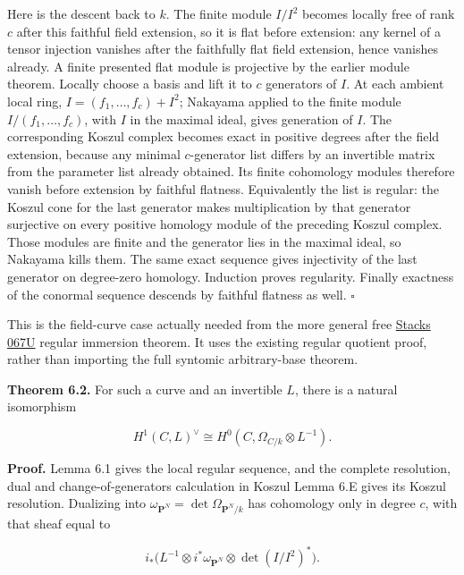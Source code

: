 \documentclass[11pt,a4paper,openany]{report}
\begin{document}
Here is the descent back to \(k\). The finite module \(I/I^2\) becomes locally free of rank \(c\) after this faithful field extension, so it is flat before extension: any kernel of a tensor injection vanishes after the faithfully flat field extension, hence vanishes already. A finite presented flat module is projective by the earlier module theorem. Locally choose a basis and lift it to \(c\) generators of \(I\). At each ambient local ring, \(I=(f_1,\ldots,f_c)+I^2\); Nakayama applied to the finite module \(I/(f_1,\ldots,f_c)\), with \(I\) in the maximal ideal, gives generation of \(I\). The corresponding Koszul complex becomes exact in positive degrees after the field extension, because any minimal \(c\)-generator list differs by an invertible matrix from the parameter list already obtained. Its finite cohomology modules therefore vanish before extension by faithful flatness. Equivalently the list is regular: the Koszul cone for the last generator makes multiplication by that generator surjective on every positive homology module of the preceding Koszul complex. Those modules are finite and the generator lies in the maximal ideal, so Nakayama kills them. The same exact sequence gives injectivity of the last generator on degree-zero homology. Induction proves regularity. Finally exactness of the conormal sequence descends by faithful flatness as well. \(\square\)

This is the field-curve case actually needed from the more general free \href{https://stacks.math.columbia.edu/tag/067U}{Stacks 067U} regular immersion theorem. It uses the existing regular quotient proof, rather than importing the full syntomic arbitrary-base theorem.

\textbf{Theorem 6.2.} For such a curve and an invertible \(L\), there is a natural isomorphism

\[
H^1(C,L)^\vee\cong H^0(C,\Omega_{C/k}\otimes L^{-1}).
\]

\textbf{Proof.} Lemma 6.1 gives the local regular sequence, and the complete resolution, dual and change-of-generators calculation in Koszul Lemma 6.E gives its Koszul resolution. Dualizing into \(\omega_{\mathbf P^N}=\det\Omega_{\mathbf P^N/k}\) has cohomology only in degree \(c\), with that sheaf equal to

\[
i_*\bigl(L^{-1}\otimes i^*\omega_{\mathbf P^N}
\otimes\det(I/I^2)^*\bigr).
\]
\end{document}
